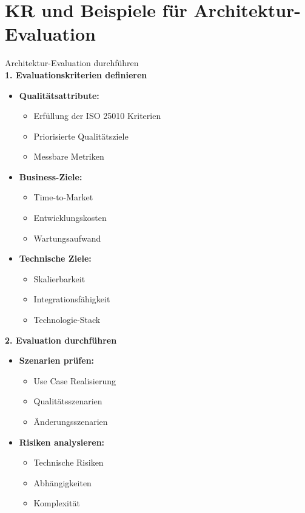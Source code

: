 \section{KR und Beispiele für Architektur-Evaluation}

\begin{KR}{Architektur-Evaluation durchführen}\\
\textbf{1. Evaluationskriterien definieren}
\begin{itemize}
    \item \textbf{Qualitätsattribute:}
    \begin{itemize}
        \item Erfüllung der ISO 25010 Kriterien
        \item Priorisierte Qualitätsziele
        \item Messbare Metriken
    \end{itemize}
    
    \item \textbf{Business-Ziele:}
    \begin{itemize}
        \item Time-to-Market
        \item Entwicklungskosten
        \item Wartungsaufwand
    \end{itemize}
    
    \item \textbf{Technische Ziele:}
    \begin{itemize}
        \item Skalierbarkeit
        \item Integrationsfähigkeit
        \item Technologie-Stack
    \end{itemize}
\end{itemize}

\textbf{2. Evaluation durchführen}
\begin{itemize}
    \item \textbf{Szenarien prüfen:}
    \begin{itemize}
        \item Use Case Realisierung
        \item Qualitätsszenarien
        \item Änderungsszenarien
    \end{itemize}
    
    \item \textbf{Risiken analysieren:}
    \begin{itemize}
        \item Technische Risiken
        \item Abhängigkeiten
        \item Komplexität
    \end{itemize}
\end{itemize}
\end{KR}

